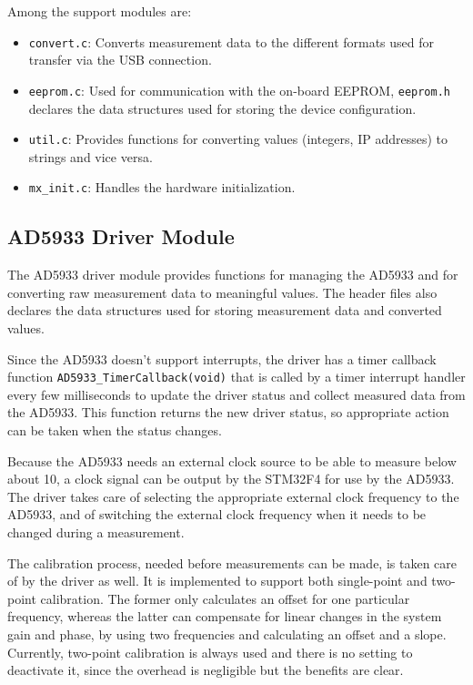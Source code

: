 Among the support modules are:
%
\begin{itemize}
	\item \verb!convert.c!: Converts measurement data to the different formats used for transfer via the USB connection.
  
  \item \verb!eeprom.c!: Used for communication with the on-board EEPROM, \verb!eeprom.h! declares the data
        structures used for storing the device configuration.
  
  \item \verb!util.c!: Provides functions for converting values (integers, IP addresses) to strings and vice versa.
  
  \item \verb!mx_init.c!: Handles the hardware initialization.
\end{itemize}


\subsection{AD5933 Driver Module}

The AD5933 driver module provides functions for managing the AD5933 and for converting raw measurement data to
meaningful values. The header files also declares the data structures used for storing measurement data and converted
values.

Since the AD5933 doesn't support interrupts, the driver has a timer callback function \verb!AD5933_TimerCallback(void)!
that is called by a timer interrupt handler every few milliseconds to update the driver status and collect measured
data from the AD5933. This function returns the new driver status, so appropriate action can be taken when the status
changes.

Because the AD5933 needs an external clock source to be able to measure below about \unit{10}{\kilo\hertz},
a clock signal can be output by the STM32F4 for use by the AD5933. The driver takes care of selecting the appropriate
external clock frequency to the AD5933, and of switching the external clock frequency when it needs to be changed
during a measurement.

The calibration process, needed before measurements can be made, is taken care of by the driver as well.
It is implemented to support both single-point and two-point calibration. The former only calculates an offset for one
particular frequency, whereas the latter can compensate for linear changes in the system gain and phase, by using two
frequencies and calculating an offset and a slope.
Currently, two-point calibration is always used and there is no setting to deactivate it, since the overhead is
negligible but the benefits are clear.


